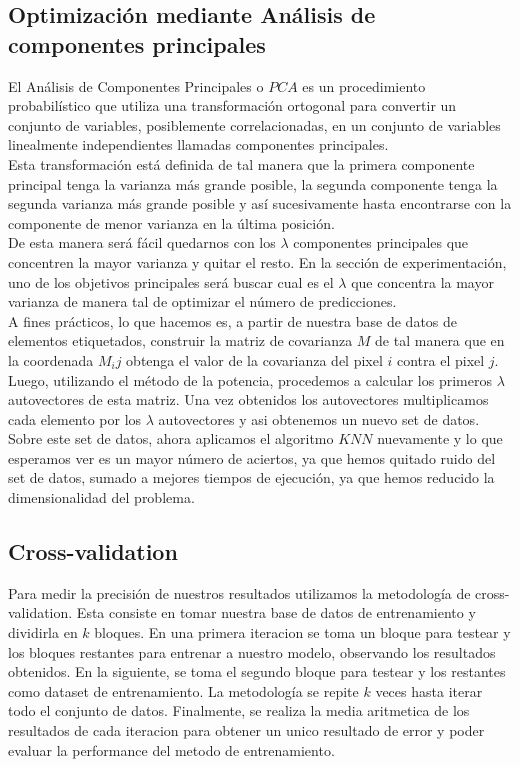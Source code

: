 \subsection{Optimización mediante Análisis de componentes principales}
El Análisis de Componentes Principales o $PCA$ es un procedimiento probabilístico que utiliza una transformación ortogonal para convertir un conjunto de variables, posiblemente correlacionadas, en un conjunto de variables linealmente independientes llamadas componentes principales.
\\
Esta transformación está definida de tal manera que la primera componente principal tenga la varianza más grande posible, la segunda componente tenga la segunda varianza más grande posible y así sucesivamente hasta encontrarse con la componente de menor varianza en la última posición.
\\
De esta manera será fácil quedarnos con los $\lambda$ componentes principales que concentren la mayor varianza y quitar el resto. En la sección de experimentación, uno de los objetivos principales será buscar cual es el $\lambda$ que concentra la mayor varianza de manera tal de optimizar el número de predicciones. 
\\
A fines prácticos, lo que hacemos es, a partir de nuestra base de datos de elementos etiquetados, construir la matriz de covarianza $M$ de tal manera que en la coordenada $M_ij$ obtenga el valor de la covarianza del pixel $i$ contra el pixel $j$.
\\
Luego, utilizando el método de la potencia, procedemos a calcular los primeros $\lambda$ autovectores de esta matriz. Una vez obtenidos los autovectores multiplicamos cada elemento por los $\lambda$ autovectores y asi obtenemos un nuevo set de datos.
\\
Sobre este set de datos, ahora aplicamos el algoritmo $KNN$ nuevamente y lo que esperamos ver es un mayor número de aciertos, ya que hemos quitado ruido del set de datos, sumado a mejores tiempos de ejecución, ya que hemos reducido la dimensionalidad del problema.
\subsection{Cross-validation}
Para medir la precisión de nuestros resultados utilizamos la metodología de cross-validation. Esta consiste en tomar nuestra base de datos de entrenamiento y dividirla en $k$ bloques. En una primera iteracion se toma un bloque para testear y los bloques restantes para entrenar a nuestro modelo, observando los resultados obtenidos. En la siguiente, se toma el segundo bloque para testear y los restantes como dataset de entrenamiento. La metodología se repite $k$ veces hasta iterar todo el conjunto de datos. Finalmente, se realiza la media aritmetica de los resultados de cada iteracion para obtener un unico resultado de error y poder evaluar la performance del metodo de entrenamiento.


